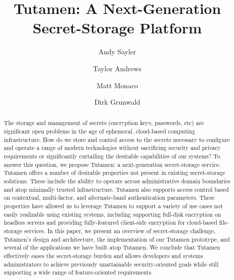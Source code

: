 \documentclass[10pt,twocolumn]{article}
\begin{document}
\title{Tutamen: A Next-Generation Secret-Storage Platform}

\author{Andy Sayler}
\author{Taylor Andrews}
\author{Matt Monaco}
\author{Dirk Grunwald}

\date{}

\maketitle

\begin{abstract}
The storage and management of secrets (encryption keys, passwords,
etc) are significant open problems in the age of ephemeral,
cloud-based computing infrastructure. How do we store and control
access to the secrets necessary to configure and operate a range of
modern technologies without sacrificing security and privacy
requirements or significantly curtailing the desirable capabilities of
our systems? To answer this question, we propose Tutamen: a
next-generation secret-storage service. Tutamen offers a number of
desirable properties not present in existing secret-storage
solutions. These include the ability to operate across administrative
domain boundaries and atop minimally trusted infrastructure. Tutamen
also supports access control based on contextual, multi-factor, and
alternate-band authentication parameters. These properties have
allowed us to leverage Tutamen to support a variety of use cases not
easily realizable using existing systems, including supporting
full-disk encryption on headless servers and providing fully-featured
client-side encryption for cloud-based file-storage services. In this
paper, we present an overview of secret-storage challenge, Tutamen's
design and architecture, the implementation of our Tutamen prototype,
and several of the applications we have built atop Tutamen. We
conclude that Tutamen effectively eases the secret-storage burden and
allows developers and systems administrators to achieve previously
unattainable security-oriented goals while still supporting a wide
range of feature-oriented requirements.
\end{abstract}








{
  
  
}
\end{document}
